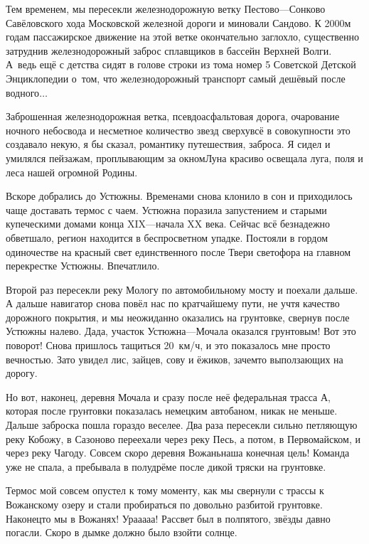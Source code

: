 Тем временем, мы пересекли железнодорожную ветку Пестово\thinspace\nobreakdash---\thinspace Сонково Савёловского хода Московской железной дороги и миновали Сандово. К 2000\sdash м годам пассажирское движение на этой ветке окончательно заглохло, существенно затруднив железнодорожный заброс сплавщиков в бассейн Верхней Волги. А~ведь ещё с детства сидят в голове строки из тома номер 5 Советской Детской Энциклопедии о~том, что железнодорожный транспорт самый дешёвый после водного$\ldots$ 

Заброшенная железнодорожная ветка, псевдоасфальтовая дорога, очарование ночного небосвода и несметное количество звезд сверху\mdash всё в совокупности это создавало некую, я бы сказал, романтику путешествия, заброса. Я сидел и умилялся пейзажам, проплывающим за окном\mdash Луна красиво освещала луга, поля и леса нашей огромной Родины. 

Вскоре добрались до Устюжны. Временами снова клонило в сон и приходилось чаще доставать термос с чаем. Устюжна поразила запустением и старыми купеческими домами конца XIX\thinspace\nobreakdash---\thinspace начала XX века. Сейчас всё безнадежно обветшало, регион находится в беспросветном упадке. Постояли в гордом одиночестве на красный свет единственного после Твери светофора на главном перекрестке Устюжны. Впечатлило. 

Второй раз пересекли реку Мологу по автомобильному мосту и поехали дальше. А дальше навигатор снова повёл нас по кратчайшему пути, не учтя качество дорожного покрытия, и мы неожиданно оказались на грунтовке, свернув после Устюжны налево. Да\sdash да,  участок Устюжна\thinspace\nobreakdash---\thinspace Мочала оказался грунтовым! Вот это поворот! Снова пришлось тащиться 20\thinspace\nbdash{}~км/ч, и это показалось мне просто вечностью. Зато увидел лис, зайцев, сову и ёжиков, зачем\sdash то выползающих на дорогу. 

Но вот, наконец, деревня Мочала и сразу после неё федеральная трасса А, которая после грунтовки показалась немецким автобаном, никак не меньше. Дальше заброска пошла гораздо веселее. Два раза пересекли сильно петляющую реку Кобожу, в Сазоново переехали через реку Песь, а потом, в Первомайском, и через реку Чагоду. Совсем скоро деревня Вожань\mdash наша конечная цель! Команда уже не спала, а пребывала в полудрёме после дикой тряски на грунтовке.

Термос мой совсем опустел к тому моменту, как мы свернули с трассы к Вожанскому озеру и стали пробираться по довольно разбитой грунтовке. Наконец\sdash то мы в Вожанях! Ура\sdash а\sdash а\sdash а\sdash а! Рассвет был в полпятого, звёзды давно погасли. Скоро в дымке должно было взойти солнце. 

